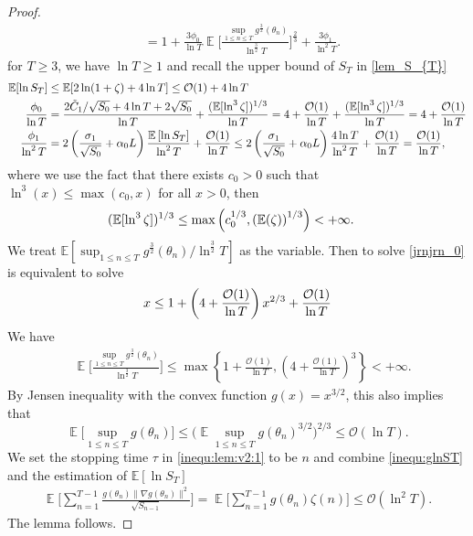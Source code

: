 \documentclass[standalone]{article}
\newcommand{\E}{\mathbb{E}}
\DeclareMathOperator{\Expect}{\mathbb{E}}
\begin{document}
\begin{proof}
{\begin{align}
&=1+\frac{3\phi_{0}}{\ln T}\Expect\Bigg[\frac{\sup_{1\le n\le T}{g^{\frac{3}{2}}(\theta_{n})}}{\ln^{\frac{3}{2}} T}\Bigg]^{\frac{2}{3}}+\frac{3\phi_{1}}{\ln^2 T}.
\end{align}}
for $T \geq 3$, we have $\ln T \geq 1$ and recall the upper bound of $S_T$ in \cref{lem_S_{T}}
\begin{align}
\E[\ln S_T] & \leq \E[2\ln(1+\zeta) + 4\ln T] \leq  \mathcal{O}(1) + 4\ln T \notag \\
\frac{\phi_0}{\ln T} & =  \frac{2\tilde{C}_1/\sqrt{S_0} + 4\ln T + 2\sqrt{S_0}}{ \ln T} + \frac{(\E[\ln^3 \zeta])^{1/3}}{\ln T}  
 = 4 + \frac{\mathcal{O}(1)}{\ln T}  + \frac{(\E[\ln^3 \zeta])^{1/3}}{\ln T} = 4 + \frac{\mathcal{O}(1)}{\ln T} \notag \\
\frac{\phi_{1}}{\ln^2 T} & =  2\left(\frac{\sigma_1}{\sqrt{S_0}} + \alpha_0 L\right)\frac{\E\left[\ln S_{T}\right]}{\ln^2 T} + \frac{\mathcal{O}(1)}{\ln T} \leq 2\left(\frac{\sigma_1}{\sqrt{S_0}} + \alpha_0 L\right)\frac{4\ln T}{\ln^2 T} + \frac{\mathcal{O}(1)}{\ln T} = \frac{\mathcal{O}(1)}{\ln T}, \notag 
\end{align}
where we use the fact that there exists $c_0 > 0$ such that $\ln^3(x) \leq \max(c_0, x)$ for all $x > 0$, then
\begin{align}
(\E[\ln^3 \zeta])^{1/3} & \leq   \max\left(c_0^{1/3},  \left( \E (\zeta)\right)^{1/3}\right) < +\infty. \notag
\end{align}
We treat $\E\left[\sup_{1\le n\le T}{g^{\frac{3}{2}}(\theta_{n})}/\ln^{\frac{3}{2}} T\right]$ as the variable. Then to solve \cref{jrnjrn_0} is equivalent to solve
\begin{align}
x \leq 1 + \left(4 + \frac{\mathcal{O}(1)}{\ln T} \right) x^{2/3} + \frac{\mathcal{O}(1)}{\ln T} \notag 
\end{align}
We have
\begin{equation}\label{adagrad:60.1}\begin{aligned}
&\Expect\Bigg[\frac{\sup_{1\le n\le T}{g^{\frac{3}{2}}(\theta_{n})}}{\ln^{\frac{3}{2}} T}\Bigg]\le\max\left\lbrace 1 + \frac{\mathcal{O}(1)}{\ln T},\left(4+ \frac{\mathcal{O}(1)}{\ln T}\right)^{3} \right\rbrace<+\infty.
\end{aligned}\end{equation} By Jensen inequality with the convex function $g(x) = x^{3/2}$, this also implies that 
\[\Expect\Big[\sup_{1\le n\le T}g(\theta_{n})\Big] \leq \Big(\Expect\sup_{1\le n\le T}g(\theta_{n})^{3/2}\Big)^{2/3}\le \mathcal{O}\left(\ln T\right).\]
We set the stopping time $\tau$ in  \cref{inequ:lem:v2:1} to be $n$ and combine \cref{inequ:glnST} and the estimation of $\E[\ln S_T]$
\begin{equation}\nonumber\begin{aligned}
\Expect\Bigg[\sum_{n=1}^{T-1}\frac{ g(\theta_{n})\|\nabla g(\theta_{n})\|^{2}}{\sqrt{S_{n-1}}}\Bigg] = \Expect\Bigg[\sum_{n=1}^{T-1} g(\theta_{n}) \zeta(n)\Bigg]\le \mathcal{O}(\ln^2 T).
\end{aligned}\end{equation} 
The lemma follows. 
\end{proof}
\end{document}
